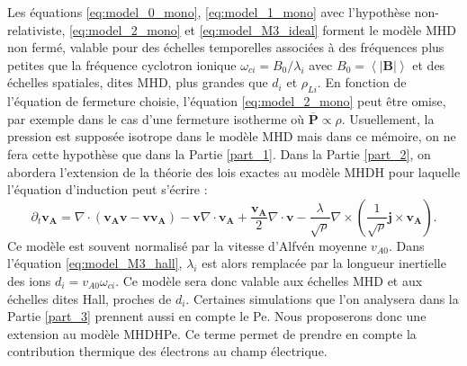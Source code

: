 Les équations \eqref{eq:model_0_mono}, \eqref{eq:model_1_mono} avec l'hypothèse non-relativiste, \eqref{eq:model_2_mono} et  \eqref{eq:model_M3_ideal} forment le modèle \ac{MHD} non fermé, valable pour des échelles temporelles associées à des fréquences plus petites que la fréquence cyclotron ionique $\omega_{ci} = B_0/\lambda_i$ avec $B_0 = \left<|\boldsymbol{B}|\right>$ et des échelles spatiales, dites \ac{MHD}, plus grandes que $d_i$ et $\rho_{Li}$. En fonction de l'équation de fermeture choisie, l'équation \eqref{eq:model_2_mono} peut être omise, par exemple dans le cas d'une fermeture isotherme où $\overline{\boldsymbol{P}} \propto \rho$.
Usuellement, la pression est supposée isotrope dans le modèle \acs{MHD} mais dans ce mémoire, on ne fera cette hypothèse que dans la Partie \ref{part_1}. Dans la Partie \ref{part_2}, on abordera l'extension de la théorie des lois exactes au modèle \acs{MHDH} pour laquelle l'équation d'induction peut s'écrire : 
\begin{equation}
\partial_t \boldsymbol{v_A}  =   \nabla \cdot \left(\boldsymbol{v_A}\boldsymbol{v} - \boldsymbol{v}\boldsymbol{v_A}\right) -  \boldsymbol{v}  \nabla \cdot \boldsymbol{v_A} +  \frac{\boldsymbol{v_A}}{2}  \nabla \cdot \boldsymbol{v} - \frac{\lambda}{ \sqrt{\rho} } \nabla \times\left(\frac{1}{\sqrt{\rho}} \boldsymbol{j}\times \boldsymbol{v_A}\right)  .\label{eq:model_M3_hall}
\end{equation}
Ce modèle est souvent normalisé par la vitesse d'Alfvén moyenne $v_{A0}$. Dans l'équation \eqref{eq:model_M3_hall}, $\lambda_i$ est alors remplacée par la longueur inertielle des ions $d_i = v_{A0}\omega_{ci}$. Ce modèle sera donc valable aux échelles MHD et aux échelles dites Hall, proches de $d_i$. Certaines simulations que l'on analysera dans la Partie \ref{part_3} prennent aussi en compte le \acl{Pe}. Nous proposerons donc une extension au modèle \acs{MHDHPe}. Ce terme permet de prendre en compte la contribution thermique des électrons au champ électrique. 

